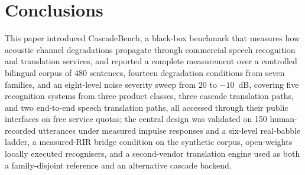 \section{Conclusions}
\label{sec:conclusions}

This paper introduced CascadeBench, a black-box benchmark that measures how
acoustic channel degradations propagate through commercial speech
recognition and translation services, and reported a complete measurement
over a controlled bilingual corpus of 480 sentences, fourteen degradation
conditions from seven families, and an eight-level noise severity sweep
from 20 to $-10$~dB, covering five recognition
systems from three product classes, three cascade translation paths,
and two end-to-end speech translation paths, all accessed through their
public interfaces on free service quotas; the central design was validated
on 150 human-recorded utterances under measured impulse responses and a
six-level real-babble ladder, a measured-RIR bridge condition on the
synthetic corpus, open-weights locally executed recognisers, and a
second-vendor translation engine used as both a family-disjoint reference
and an alternative cascade backend.

